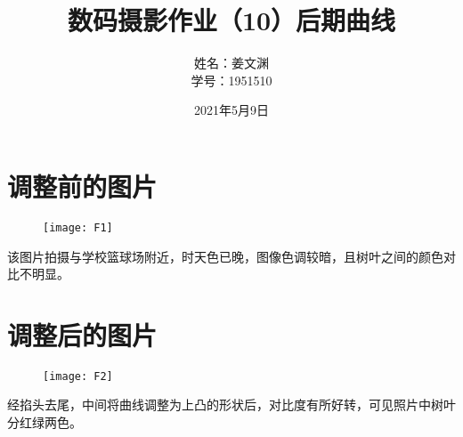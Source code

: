 \documentclass[cn,black,10pt,normal]{elegantnote}
\title{数码摄影作业（10）后期曲线}
\author{姓名：姜文渊\\学号：1951510}
\date{2021年5月9日}
\begin{document}
\maketitle

\section{调整前的图片}

\begin{figure}[H]
    \centering
    \texttt{[image: F1]}
    \label{F-02}
\end{figure}

该图片拍摄与学校篮球场附近，时天色已晚，图像色调较暗，且树叶之间的颜色对比不明显。

\section{调整后的图片}

\begin{figure}[H]
    \centering
    \texttt{[image: F2]}
    \label{F-01}
\end{figure}

经掐头去尾，中间将曲线调整为上凸的形状后，对比度有所好转，可见照片中树叶分红绿两色。


\end{document}
